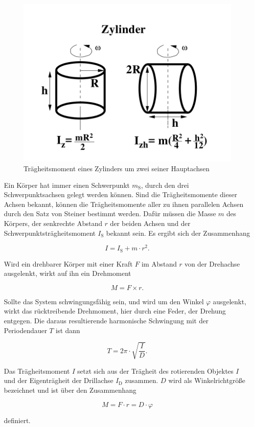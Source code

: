 \begin{figure}
    \centering
    \includegraphics[width=\textwidth/2]{images/zylinder.png}
    \caption{Trägheitsmoment eines Zylinders um zwei seiner Hauptachsen \cite{V101}}
    \label{fig:zylinder}
\end{figure}

Ein Körper hat immer einen Schwerpunkt $m_\text{S}$, durch den drei Schwerpunktsachsen gelegt werden können. 
Sind die Trägheitsmomente dieser Achsen bekannt, können die Trägheitsmomente aller zu ihnen parallelen Achsen durch den Satz von Steiner bestimmt werden. 
Dafür müssen die Masse $m$ des Körpers, der senkrechte Abstand $r$ der beiden Achsen und der Schwerpunktsträgheitsmoment $I_\text{S}$ bekannt sein. Es ergibt sich der Zusammenhang 

\begin{equation}
    I = I_\text{S} + m \cdot r^2.
    \label{eq:steiner}
\end{equation}

Wird ein drehbarer Körper mit einer Kraft $F$ im Abstand $r$ von der Drehachse ausgelenkt, wirkt auf ihn ein Drehmoment

\begin{equation}
    M = F \times r.
    \label{eq:drehmoment}
\end{equation}

Sollte das System schwingungsfähig sein, und wird um den Winkel $\varphi$ ausgelenkt, wirkt das rücktreibende Drehmoment, hier durch eine Feder, der Drehung entgegen. Die daraus resultierende harmonische Schwingung mit der Periodendauer $T$ ist dann

\begin{equation}
    T = 2\pi \cdot \sqrt{\frac{I}{D}}.
    \label{eq:periodendauer}
\end{equation}

Das Trägheitsmoment $I$ setzt sich aus der Trägheit des rotierenden Objektes $I$ und der Eigenträgheit der Drillachse $I_\text{D}$ zusammen. $D$ wird als Winkelrichtgröße bezeichnet und ist über den Zusammenhang  

\begin{equation}
    M = F \cdot r = D \cdot \varphi
    \label{eq:winkelrichtgroesse}
\end{equation}

definiert.
\newpage